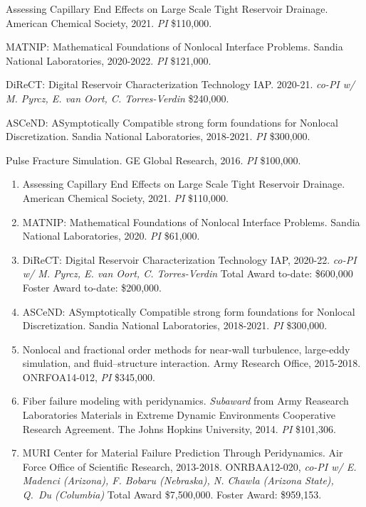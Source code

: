 \begin{etaremune}
    \item Assessing Capillary End Effects on Large Scale Tight Reservoir Drainage.  American Chemical Society, 2021. \textit{PI} \$110,000.
    \item MATNIP: Mathematical Foundations of Nonlocal Interface Problems. Sandia National Laboratories, 2020-2022. \textit{PI} \$121,000. 
    \item DiReCT: Digital Reservoir Characterization Technology IAP. 2020-21. \textit{co-PI w/ M. Pyrcz, E. van Oort, C. Torres-Verdin} \$240,000.
    \item ASCeND: ASymptotically Compatible strong form foundations for Nonlocal Discretization. Sandia National Laboratories, 2018-2021. \textit{PI} \$300,000.
    \item Pulse Fracture Simulation. GE Global Research, 2016. \textit{PI} \$100,000.
\else
\begin{enumerate}
\fi
    \item Assessing Capillary End Effects on Large Scale Tight Reservoir Drainage.  American Chemical Society, 2021. \textit{PI} \$110,000.
  \item MATNIP: Mathematical Foundations of Nonlocal Interface Problems. Sandia National Laboratories, 2020. \textit{PI} \$61,000. 
    \item DiReCT: Digital Reservoir Characterization Technology IAP, 2020-22. \textit{co-PI w/ M. Pyrcz, E. van Oort, C. Torres-Verdin} Total Award to-date: \$600,000 Foster Award to-date: \$200,000.
  \item ASCeND: ASymptotically Compatible strong form foundations for Nonlocal Discretization. Sandia National Laboratories, 2018-2021. \textit{PI} \$300,000.
  \item Nonlocal and fractional order methods for near-wall turbulence, large-eddy simulation, and fluid--structure interaction. Army Research Office, 2015-2018. ONRFOA14-012, \textit{PI} {\$}345,000.
  \item Fiber failure modeling with peridynamics. \textit{Subaward} from Army Reasearch Laboratories Materials in Extreme Dynamic Environments Cooperative Research Agreement.  The Johns Hopkins University, 2014. \textit{PI} \$101,306.
  \item MURI Center for Material Failure Prediction Through Peridynamics. Air Force Office of Scientific Research, 2013-2018. ONRBAA12-020, \textit{co-PI w/ E. Madenci (Arizona), F. Bobaru (Nebraska), N. Chawla (Arizona State), Q.\ Du (Columbia)} Total Award {\$}7,500,000.  Foster Award: \$959,153.

\end{enumerate}
\end{etaremune}
